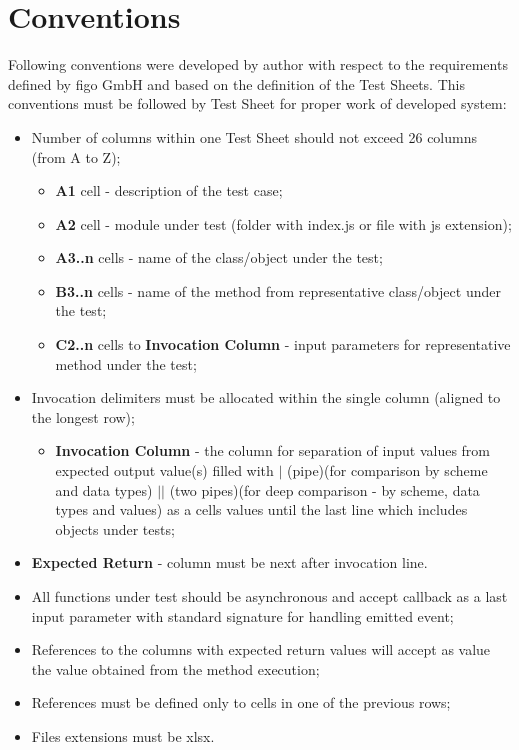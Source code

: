 \chapter{Conventions}
\label{sec:convnetions}
Following conventions were developed by author with respect to the requirements defined by figo GmbH and based on the definition of the Test Sheets. This conventions must be followed by Test Sheet for proper work of developed system:
\begin{itemize}
	\item Number of columns within one Test Sheet should not exceed 26 columns (from A to Z);
	\begin{itemize}
		\item \textbf{A1} cell - description of the test case;
		\item \textbf{A2} cell - module under test (folder with index.js or file with js extension);
		\item \textbf{A3..n} cells - name of the class/object under the test;
		\item \textbf{B3..n} cells - name of the method from representative class/object under the test;
		\item \textbf{C2..n} cells to \textbf{Invocation Column}   - input parameters for representative method under the test;
	\end{itemize}
	\item Invocation delimiters must be allocated within the single column (aligned to the longest row);
	\begin{itemize}
		\item \textbf{Invocation Column} - the column for separation of input values from expected output value(s) filled with $|$ (pipe)(for comparison by scheme and data types) $||$ (two pipes)(for deep comparison - by scheme, data types and values) as a cells values until the last line which includes objects under tests;
	\end{itemize}
	\item \textbf{Expected Return} - column must be next after invocation line.
	\item All functions under test should be asynchronous and accept callback as a last input parameter with standard signature for handling emitted event;
	\item References to the columns with expected return values will accept as value the value obtained from the method execution;
	\item References must be defined only to cells in one of the previous rows;
	\item Files extensions must be xlsx.
\end{itemize}

